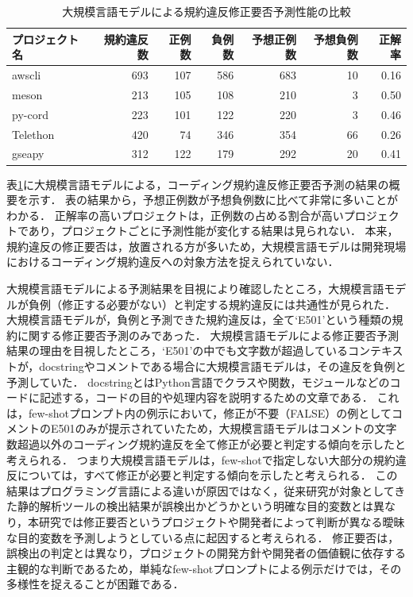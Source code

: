 \documentclass[11pt]{jreport}
\begin{document}
\begin{table}[t]
  \centering
  \caption{大規模言語モデルによる規約違反修正要否予測性能の比較}
  \label{tab:project-metrics}
  \begin{tabular}{lrrrrrr}
    \toprule
    プロジェクト名 & 規約違反数 & 正例数 & 負例数 & 予想正例数 & 予想負例数 & 正解率 \\
    \midrule
    awscli   & 693 & 107 & 586 & 683 & 10 & 0.16 \\
    meson    & 213 & 105 & 108 & 210 & 3  & 0.50 \\
    py-cord  & 223 & 101 & 122 & 220 & 3  & 0.46 \\
    Telethon & 420 & 74  & 346 & 354 & 66 & 0.26 \\
    gseapy   & 312 & 122 & 179 & 292 & 20 & 0.41 \\
    \bottomrule
  \end{tabular}
\end{table}

表\ref{tab:project-metrics}に大規模言語モデルによる，コーディング規約違反修正要否予測の結果の概要を示す．
表の結果から，予想正例数が予想負例数に比べて非常に多いことがわかる．
正解率の高いプロジェクトは，正例数の占める割合が高いプロジェクトであり，プロジェクトごとに予測性能が変化する結果は見られない．
本来，規約違反の修正要否は，放置される方が多いため，大規模言語モデルは開発現場におけるコーディング規約違反への対象方法を捉えられていない．

大規模言語モデルによる予測結果を目視により確認したところ，大規模言語モデルが負例（修正する必要がない）と判定する規約違反には共通性が見られた．
大規模言語モデルが，負例と予測できた規約違反は，全て`E501'という種類の規約に関する修正要否予測のみであった．
大規模言語モデルによる修正要否予測結果の理由を目視したところ，`E501'の中でも文字数が超過しているコンテキストが，docstringやコメントである場合に大規模言語モデルは，その違反を負例と予測していた．
docstringとはPython言語でクラスや関数，モジュールなどのコードに記述する，コードの目的や処理内容を説明するための文章である．
これは，few-shotプロンプト内の例示において，修正が不要（FALSE）の例としてコメントのE501のみが提示されていたため，大規模言語モデルはコメントの文字数超過以外のコーディング規約違反を全て修正が必要と判定する傾向を示したと考えられる．
つまり大規模言語モデルは，few-shotで指定しない大部分の規約違反については，すべて修正が必要と判定する傾向を示したと考えられる．
この結果はプログラミング言語による違いが原因ではなく，従来研究が対象としてきた静的解析ツールの検出結果が誤検出かどうかという明確な目的変数とは異なり，本研究では修正要否というプロジェクトや開発者によって判断が異なる曖昧な目的変数を予測しようとしている点に起因すると考えられる．
修正要否は，誤検出の判定とは異なり，プロジェクトの開発方針や開発者の価値観に依存する主観的な判断であるため，単純なfew-shotプロンプトによる例示だけでは，その多様性を捉えることが困難である．
\end{document}
